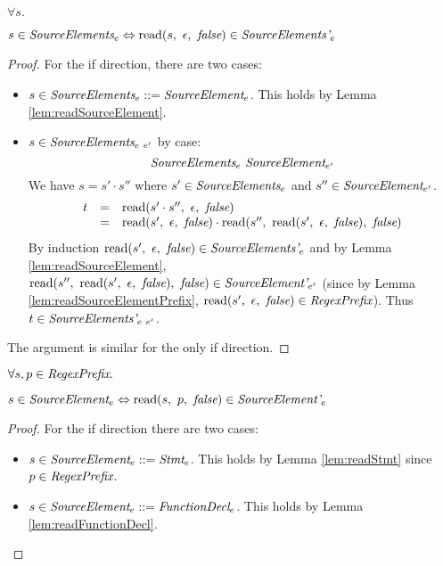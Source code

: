 \documentclass[onecolumn]{sigplanconf-onecolumn}
\begin{document}
\begin{lemma}\mbox{}

  \( \forall s. \) 

  \( s \in \textit{SourceElements}_{e} \Leftrightarrow 
  \textrm{read}(s,~\epsilon,~\textit{false}) \in \textit{SourceElements'}_{e} \)
\end{lemma}
\begin{proof}
  For the if direction, there are two cases:
  \begin{itemize}
  \item \( s \in \textit{SourceElements}_{e} ::=
    \textit{SourceElement}_{e} \). This holds by Lemma
    \ref{lem:readSourceElement}.
    
  \item \( s \in \textit{SourceElements}_{e~e'} \) by case:
    \[
    \textit{SourceElements}_{e}~\textit{SourceElement}_{e'} 
    \] 
    We have
    \( s = s' \cdot s'' \) where \( s' \in \textit{SourceElements}_{e}
    \) and \( s'' \in \textit{SourceElement}_{e'} \).
    \[
    \begin{array}{rcl}
      t &=& \textrm{read}(s'\cdot s'',~\epsilon,~\textit{false})
      \\
      &=& \textrm{read}(s',~\epsilon,~\textit{false})\cdot  
      \textrm{read}(s'',~\textrm{read}(s',~\epsilon,~\textit{false}),~\textit{false})
    \end{array}
    \]
    By induction \( \textrm{read}(s',~\epsilon,~\textit{false}) \in
    \textit{SourceElements'}_{e} \) and by Lemma
    \ref{lem:readSourceElement}, \( \textrm{read}(s'',~
      \textrm{read}(s',~\epsilon,~\textit{false}),~\textit{false}) \in \textit{SourceElement'}_{e'} \) (since
    by Lemma \ref{lem:readSourceElementPrefix}, \( 
    \textrm{read}(s',~\epsilon,~\textit{false}) \in \textit{RegexPrefix} \)). Thus \( t \in
    \textit{SourceElements'}_{e~e'} \).
  \end{itemize}
  
  The argument is similar for the only if direction.
\end{proof}


\begin{lemma}\mbox{}
  
  \( \forall s, p \in \textit{RegexPrefix}. \)

  \( s \in \textit{SourceElement}_{e} \Leftrightarrow 
  \textrm{read}(s,~p,~\textit{false}) \in \textit{SourceElement'}_{e} \)
\end{lemma}
\begin{proof}
  For the if direction there are two cases:
  \begin{itemize}
  \item \( s \in \textit{SourceElement}_{e} ::= \textit{Stmt}_{e} \).
    This holds by Lemma \ref{lem:readStmt} since \( p \in \textit{RegexPrefix} \).
    
  \item \( s \in \textit{SourceElement}_{e} ::=
    \textit{FunctionDecl}_{e} \). This holds by Lemma
    \ref{lem:readFunctionDecl}.
  \end{itemize}
\end{proof}
\end{document}
